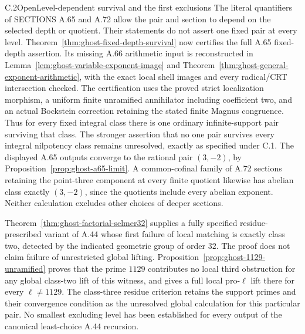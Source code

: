 \begin{result}{C.2}{Open}{Level-dependent survival and the first exclusions}
\label{task:ghost-c2}
The literal quantifiers of SECTIONS A.65 and A.72 allow the
pair and section to depend on the selected depth or quotient.
Their statements do not assert one fixed pair at every level.
Theorem~\ref{thm:ghost-fixed-depth-survival} now certifies
the full A.65 fixed-depth assertion. Its missing A.66
arithmetic input is reconstructed in
Lemma~\ref{lem:ghost-variable-exponent-image} and
Theorem~\ref{thm:ghost-general-exponent-arithmetic}, with
the exact local shell images and every radical/CRT
intersection checked. The certification uses the proved
strict localization morphism, a uniform finite unramified
annihilator including coefficient two, and an actual
Bockstein correction retaining the stated finite Magnus
congruence. Thus for every fixed integral class there
is one ordinary infinite-support pair surviving that class.
The stronger assertion that no one pair survives every
integral nilpotency class remains unresolved, exactly as
specified under C.1. The displayed A.65 outputs converge
to the rational pair \((3,-2)\), by
Proposition~\ref{prop:ghost-a65-limit}. A common-cofinal family
of A.72 sections retaining the point-three component at every
finite quotient likewise has abelian class exactly
\((3,-2)\), since the quotients include every abelian exponent.
Neither calculation excludes other choices of deeper sections.

Theorem~\ref{thm:ghost-factorial-selmer32} supplies a fully
specified residue-prescribed variant of A.44 whose first
failure of local matching is exactly class two, detected by
the indicated geometric group of order \(32\). The proof
does not claim failure of unrestricted global lifting.
Proposition~\ref{prop:ghost-1129-unramified} proves that
the prime \(1129\) contributes no local third obstruction
for any global class-two lift of this witness, and gives a
full local pro-\(\ell\) lift there for every \(\ell\ne1129\).
The class-three residue criterion retains the support
primes and their convergence condition as the unresolved
global calculation for this particular pair.
No smallest excluding level has been established for every
output of the canonical least-choice A.44 recursion.


\end{result}
